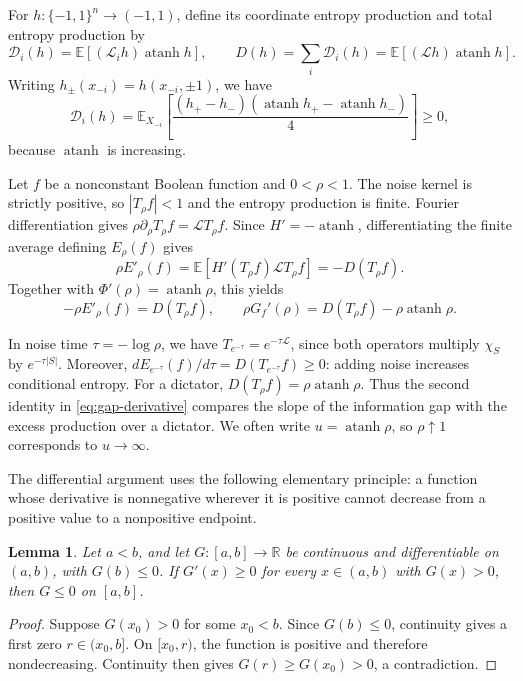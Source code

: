 \documentclass[11pt,letterpaper]{amsart}
\newcommand{\E}{\mathbb E}
\newcommand{\R}{\mathbb R}
\newcommand{\1}{\mathbf 1}
\DeclareMathOperator{\atanh}{atanh}
\newtheorem{lemma}[theorem]{Lemma}
\numberwithin{equation}{section}
\begin{document}
For $h:\{-1,1\}^n\to(-1,1)$, define its coordinate entropy
production and total entropy production by
\begin{equation}\label{eq:entropy-production}
 \mathcal D_i(h)=\E[(\mathcal L_i h)\atanh h],
 \qquad
 D(h)=\sum_i\mathcal D_i(h)
     =\E[(\mathcal Lh)\atanh h].
\end{equation}
Writing $h_\pm(x_{-i})=h(x_{-i},\pm1)$, we have
\[
 \mathcal D_i(h)
 =\E_{X_{-i}}\left[
   \frac{(h_+-h_-)(\atanh h_+-\atanh h_-)}4
   \right]\ge0,
\]
because $\atanh$ is increasing.

Let $f$ be a nonconstant Boolean function and $0<\rho<1$.
The noise kernel is strictly positive, so $|T_\rho f|<1$
and the entropy production is finite.
Fourier differentiation gives
$\rho\partial_\rho T_\rho f=\mathcal LT_\rho f$.
Since $H'=-\atanh$, differentiating the finite average defining
$E_\rho(f)$ gives
\[
 \rho E'_\rho(f)
 =\E[H'(T_\rho f)\mathcal LT_\rho f]
 =-D(T_\rho f).
\]
Together with $\Phi'(\rho)=\atanh\rho$, this yields
\begin{equation}\label{eq:gap-derivative}
 -\rho E'_\rho(f)=D(T_\rho f),
 \qquad
 \rho G_f'(\rho)=D(T_\rho f)-\rho\atanh\rho.
\end{equation}

In noise time $\tau=-\log\rho$, we have
$T_{e^{-\tau}}=e^{-\tau\mathcal L}$, since both operators
multiply $\chi_S$ by $e^{-\tau|S|}$.
Moreover,
$dE_{e^{-\tau}}(f)/d\tau=D(T_{e^{-\tau}}f)\ge0$:
adding noise increases conditional entropy.
For a dictator, $D(T_\rho f)=\rho\atanh\rho$.
Thus the second identity in \eqref{eq:gap-derivative}
compares the slope of the information gap with the excess
production over a dictator.
We often write $u=\atanh\rho$, so $\rho\uparrow1$ corresponds
to $u\to\infty$.

The differential argument uses the following elementary principle:
a function whose derivative is nonnegative wherever it is positive
cannot decrease from a positive value to a nonpositive endpoint.

\begin{lemma}\label{ub:barrier}
Let $a<b$, and let $G:[a,b]\to\R$ be continuous and differentiable
on $(a,b)$, with $G(b)\le0$.
If $G'(x)\ge0$ for every $x\in(a,b)$ with $G(x)>0$,
then $G\le0$ on $[a,b]$.
\end{lemma}

\begin{proof}
Suppose $G(x_0)>0$ for some $x_0<b$.
Since $G(b)\le0$, continuity gives a first zero
$r\in(x_0,b]$.
On $[x_0,r)$, the function is positive and therefore nondecreasing.
Continuity then gives
$G(r)\ge G(x_0)>0$, a contradiction.
\end{proof}
\end{document}
